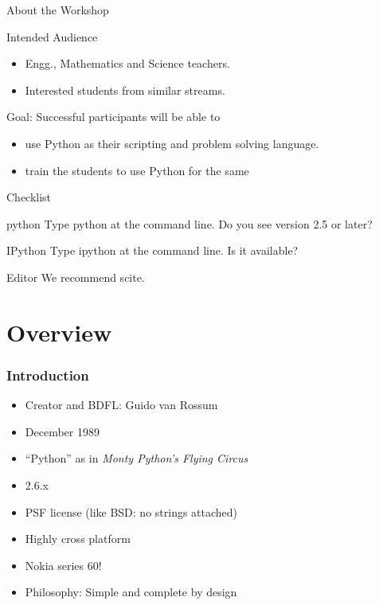 \documentclass[14pt,compress]{beamer}
\begin{document}
\begin{frame}{About the Workshop}
  \begin{block}{Intended Audience}
  \begin{itemize}
       \item Engg., Mathematics and Science teachers.
       \item Interested students from similar streams.
  \end{itemize}
  \end{block}  

  \begin{block}{Goal:}
	Successful participants will be able to 
        \begin{itemize}
          \item use Python as their scripting and problem solving language. 
          \item train the students to use Python for the same
        \end{itemize}
  \end{block}
\end{frame}

\begin{frame}{Checklist}
        \begin{block}{python}
          Type python at the command line. Do you see version 2.5 or later?
        \end{block}
        \begin{block}{IPython}
          Type ipython at the command line. Is it available?
        \end{block}
        \begin{block}{Editor}
          We recommend scite. 
        \end{block}
\end{frame}

\section{Overview}
\begin{frame}
  \frametitle{Introduction}
  \begin{itemize}
  \item Creator and BDFL: Guido van Rossum
  \item December 1989
  \item ``Python'' as in \emph {Monty Python's Flying Circus}
  \item 2.6.x
  \item PSF license (like BSD: no strings attached)
  \item Highly cross platform
  \item Nokia series 60!
  \item \alert{Philosophy:} Simple and complete by design
  \end{itemize}
\end{frame}
\end{document}
